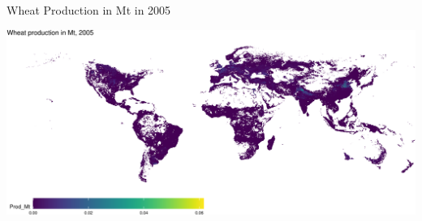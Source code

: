 \documentclass[
  ignorenonframetext,
  aspectratio=169,
]{beamer}
\begin{document}
\begin{frame}{Wheat Production in Mt in 2005}
\protect\hypertarget{wheat-production-in-mt-in-2005}{}
\linespread{0.5}

\includegraphics{global_n_files/figure-beamer/unnamed-chunk-7-1.pdf}

\linespread{2}
\end{frame}
\end{document}
